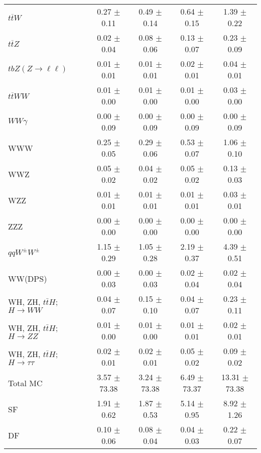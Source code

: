 \begin{tabular}{l|cccc}
                   $t\overline{t}W$ &  0.27 $\pm$  0.11 &  0.49 $\pm$  0.14 &  0.64 $\pm$  0.15 &  1.39 $\pm$  0.22 \\
                   $t\overline{t}Z$ &  0.02 $\pm$  0.04 &  0.08 $\pm$  0.06 &  0.13 $\pm$  0.07 &  0.23 $\pm$  0.09 \\
    $tbZ (Z \rightarrow \ell \ell)$ &  0.01 $\pm$  0.01 &  0.01 $\pm$  0.01 &  0.02 $\pm$  0.01 &  0.04 $\pm$  0.01 \\
                  $t\overline{t}WW$ &  0.01 $\pm$  0.00 &  0.01 $\pm$  0.00 &  0.01 $\pm$  0.00 &  0.03 $\pm$  0.00 \\
                         $WW\gamma$ &  0.00 $\pm$  0.09 &  0.00 $\pm$  0.09 &  0.00 $\pm$  0.09 &  0.00 $\pm$  0.09 \\
                                WWW &  0.25 $\pm$  0.05 &  0.29 $\pm$  0.06 &  0.53 $\pm$  0.07 &  1.06 $\pm$  0.10 \\
                                WWZ &  0.05 $\pm$  0.02 &  0.04 $\pm$  0.02 &  0.05 $\pm$  0.02 &  0.13 $\pm$  0.03 \\
                                WZZ &  0.01 $\pm$  0.01 &  0.01 $\pm$  0.01 &  0.01 $\pm$  0.01 &  0.03 $\pm$  0.01 \\
                                ZZZ &  0.00 $\pm$  0.00 &  0.00 $\pm$  0.00 &  0.00 $\pm$  0.00 &  0.00 $\pm$  0.00 \\
                 $qqW^{\pm}W^{\pm}$ &  1.15 $\pm$  0.29 &  1.05 $\pm$  0.28 &  2.19 $\pm$  0.37 &  4.39 $\pm$  0.51 \\
                            WW(DPS) &  0.00 $\pm$  0.03 &  0.00 $\pm$  0.03 &  0.02 $\pm$  0.04 &  0.02 $\pm$  0.04 \\
WH, ZH, $t\bar{t}H$; $H \rightarrow WW$ &  0.04 $\pm$  0.07 &  0.15 $\pm$  0.10 &  0.04 $\pm$  0.07 &  0.23 $\pm$  0.11 \\
WH, ZH, $t\bar{t}H$; $H \rightarrow ZZ$ &  0.01 $\pm$  0.00 &  0.01 $\pm$  0.00 &  0.01 $\pm$  0.01 &  0.02 $\pm$  0.01 \\
WH, ZH, $t\bar{t}H$; $H \rightarrow \tau\tau$ &  0.02 $\pm$  0.01 &  0.02 $\pm$  0.01 &  0.05 $\pm$  0.02 &  0.09 $\pm$  0.02 \\
\hline\hline
                           Total MC &  3.57 $\pm$ 73.38 &  3.24 $\pm$ 73.38 &  6.49 $\pm$ 73.37 & 13.31 $\pm$ 73.38 \\
\hline
                                 SF &  1.91 $\pm$  0.62 &  1.87 $\pm$  0.53 &  5.14 $\pm$  0.95 &  8.92 $\pm$  1.26 \\
                                 DF &  0.10 $\pm$  0.06 &  0.08 $\pm$  0.04 &  0.04 $\pm$  0.03 &  0.22 $\pm$  0.07 \\

\end{tabular}

